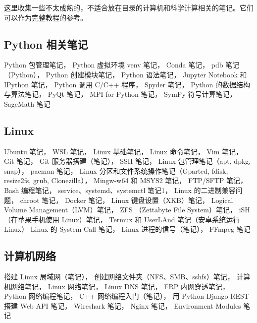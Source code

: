
这里收集一些不太成熟的，不适合放在目录的计算机和科学计算相关的笔记。它们可以作为完整教程的参考。

\subsection{Python 相关笔记}
Python 包管理笔记，
Python 虚拟环境 venv 笔记，
Conda 笔记，
pdb 笔记（Python），
Python 创建模块笔记，
Python 语法笔记，
Jupyter Notebook 和 IPython 笔记，
Python 调用 C/C++ 程序，
Spyder 笔记，
Python 的数据结构与算法笔记，
PyQt 笔记，
MPI for Python 笔记，
SymPy 符号计算笔记，
SageMath 笔记

\subsection{Linux}
Ubuntu 笔记，
WSL 笔记，
Linux 基础笔记，
Linux 命令笔记，
Vim 笔记，
Git 笔记，
Git 服务器搭建（笔记），
SSH 笔记，
Linux 包管理笔记（apt, dpkg, snap），
pacman 笔记，
Linux 分区和文件系统操作笔记（Gparted, fdisk, resize2fs, grub, Clonezilla），
Mingw-w64 和 MSYS2 笔记，
FTP/SFTP 笔记，
Bash 编程笔记，
service、systemd、systemctl 笔记1，
Linux 的二进制兼容问题，
chroot 笔记，
Docker 笔记，
Linux 键盘设置（XKB）笔记，
Logical Volume Management（LVM）笔记，
ZFS （Zettabyte File System）笔记，
iSH （在苹果手机使用 Linux）笔记，
Termux 和 UserLAnd 笔记（安卓系统运行 Linux）
Linux 的 System Call 笔记，
Linux 进程的信号（笔记），
FFmpeg 笔记

\subsection{计算机网络}
搭建 Linux 局域网（笔记），
创建网络文件夹（NFS、SMB、sshfs）笔记，
计算机网络笔记，
Linux 网络笔记，
Linux DNS 笔记，
FRP 内网穿透笔记，
Python 网络编程笔记，
C++ 网络编程入门（笔记），
用 Python Django REST 搭建 Web API 笔记，
Wireshark 笔记，
Nginx 笔记，
Environment Modules 笔记


